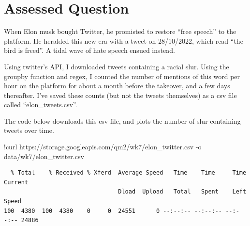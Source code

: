 \documentclass[
  letterpaper,
  DIV=11,
  numbers=noendperiod]{scrreprt}
\newenvironment{Shaded}{\begin{snugshade}}{\end{snugshade}}
\newcommand{\NormalTok}[1]{\textcolor[rgb]{0.00,0.23,0.31}{#1}}
\newcommand{\OperatorTok}[1]{\textcolor[rgb]{0.37,0.37,0.37}{#1}}
\begin{document}
\hypertarget{assessed-question-5}{%
\section{Assessed Question}\label{assessed-question-5}}

When Elon musk bought Twitter, he promisted to restore ``free speech''
to the platform. He heralded this new era with a tweet on 28/10/2022,
which read ``the bird is freed''. A tidal wave of hate speech ensued
instead.

Using twitter's API, I downloaded tweets containing a racial slur. Using
the groupby function and regex, I counted the number of mentions of this
word per hour on the platform for about a month before the takeover, and
a few days thereafter. I've saved these counts (but not the tweets
themselves) as a csv file called ``elon\_tweets.csv''.

The code below downloads this csv file, and plots the number of
slur-containing tweets over time.

\begin{Shaded}
\begin{Highlighting}[]
\OperatorTok{!}\NormalTok{curl https:}\OperatorTok{//}\NormalTok{storage.googleapis.com}\OperatorTok{/}\NormalTok{qm2}\OperatorTok{/}\NormalTok{wk7}\OperatorTok{/}\NormalTok{elon\_twitter.csv }\OperatorTok{{-}}\NormalTok{o data}\OperatorTok{/}\NormalTok{wk7}\OperatorTok{/}\NormalTok{elon\_twitter.csv}
\end{Highlighting}
\end{Shaded}

\begin{verbatim}
  % Total    % Received % Xferd  Average Speed   Time    Time     Time  Current
                                 Dload  Upload   Total   Spent    Left  Speed
100  4380  100  4380    0     0  24551      0 --:--:-- --:--:-- --:--:-- 24886
\end{verbatim}
\end{document}
